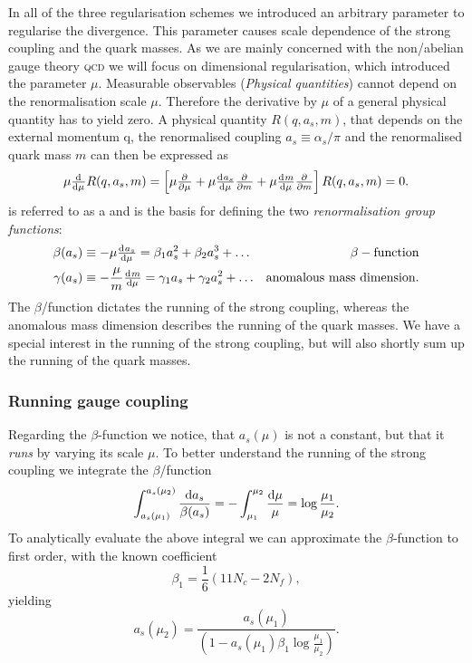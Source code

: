 \documentclass[../../index.tex]{subfiles}
\begin{document}
In all of the three regularisation schemes we introduced an arbitrary parameter
to regularise the divergence. This parameter causes scale dependence of the
strong coupling and the quark masses. As we are mainly concerned with the
non\-/abelian gauge theory \textsc{qcd} we will focus on dimensional
regularisation, which introduced the parameter $\mu$. Measurable observables
(\textit{Physical quantities}) cannot depend on the renormalisation scale $\mu$.
Therefore the derivative by $\mu$ of a general physical quantity has to yield
zero. A physical quantity $R(q, a_s, m)$, that depends on the external momentum
q, the renormalised coupling $a_s\equiv\alpha_s/\pi$ and the renormalised quark
mass $m$ can then be expressed as
\begin{equation}
  \label{eq:RGE}
  \mu \od{}{\mu}R(q, a_s, m) = \left[ \mu \pd{}{\mu} + \mu \od{a_s}{\mu} \pd{}{m} + \mu \od{m}{\mu} \pd{}{m} \right] R(q, a_s, m) = 0.
\end{equation}
 is referred to as a 
and is the basis for defining the two \textit{renormalisation group functions}:
\begin{align}
  \beta(a_s) &\equiv -\mu \od{a_s}{\mu} = \beta_1 a_s^2 + \beta_2 a_s^3 + \dots & \beta-\text{function}
                                                                                  \label{eq:betaFunction} \\
  \gamma(a_s) &\equiv - \frac{\mu}{m} \od{m}{\mu} = \gamma_1 a_s + \gamma_2 a_s^2 + \dots & \text{anomalous mass dimension}.
                                                                                            \label{eq:anomalousMassDimension}
\end{align}
The \(\beta\)\-/function dictates the running of the strong coupling, whereas
the anomalous mass dimension describes the running of the quark masses. We have
a special interest in the running of the strong coupling, but will also shortly
sum up the running of the quark masses.

\subsubsection{Running gauge coupling}
Regarding the $\beta$-function we notice, that $a_s(\mu)$ is not a constant, but
that it \textit{runs} by varying its scale $\mu$. To better understand the
running of the strong coupling we integrate the \(\beta\)\-/function
\begin{equation}
  \int_{a_s(\mu_1)}^{a_s(\mu_2)}\frac{\dif a_s}{\beta(a_s)} = - \int_{\mu_1}^{\mu_2} \frac{\dif \mu}{\mu} = \log \frac{\mu_1}{\mu_2}.
\end{equation}
To analytically evaluate the above integral we can approximate the
$\beta$-function to first order, with the known coefficient
\begin{equation}
  \label{eq:firstBetaCoefficient}
  \beta_1 = \frac{1}{6}(11 N_c - 2 N_f),
\end{equation}
yielding
\begin{equation}
  \label{eq:strongCouplingFirstOrder}
  a_s(\mu_2) = \frac{a_s(\mu_1)}{\left( 1 - a_s(\mu_1) \beta_1 \log\frac{\mu_1}{\mu_2} \right)}.
\end{equation}
\end{document}
